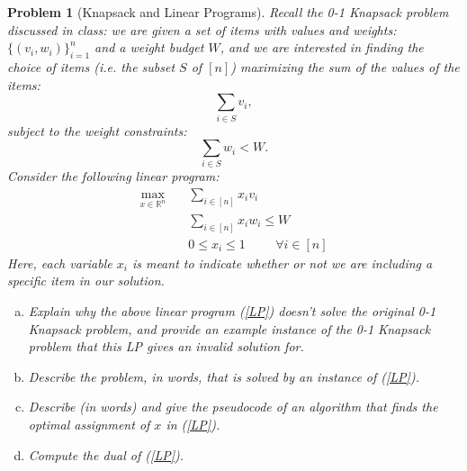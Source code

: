\documentclass[10pt]{article}
\newtheorem{problem}{\sc\color{cit}Problem}
\begin{document}
\begin{problem}[Knapsack and Linear Programs]
Recall the 0-1 Knapsack problem discussed in class: we are given a set of items with values and weights: $\{(v_i,w_i)\}_{i=1}^n$ and a weight budget $W$, and we are interested in finding the choice of items (i.e. the subset $S$ of $[n]$) maximizing the sum of the values of the items:
\[
    \sum_{i\in S} v_i,
\]
subject to the weight constraints:
\[
    \sum_{i\in S} w_i < W.
\]
Consider the following linear program:
\begin{align}\label{LP}
    \max_{x \in \mathbb{R}^n} \quad &\sum_{i\in [n]}x_iv_i\\
    &  \sum_{i\in [n]}x_i w_i \leq W \nonumber \\
    & 0 \leq x_i \leq 1 \hspace{1cm} \forall i\in [n]\nonumber 
\end{align}
Here, each variable $x_i$ is meant to indicate whether or not we are including a specific item in our solution.
\begin{enumerate}[(a)]
    \item Explain why the above linear program (\ref{LP}) doesn't solve the original 0-1 Knapsack problem, and provide an example instance of the 0-1 Knapsack problem that this LP gives an invalid solution for. 
    \item Describe the problem, in words, that is solved by an instance of (\ref{LP}).
    \item Describe (in words) and give the pseudocode of an algorithm that finds the optimal assignment of $x$ in (\ref{LP}).
    \item Compute the dual of (\ref{LP}).
\end{enumerate}

\end{problem}
\end{document}
